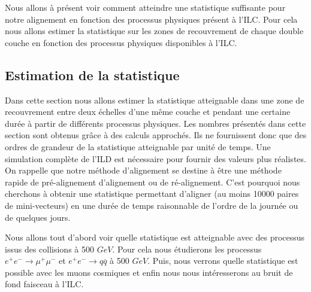   \medskip
  
  Nous allons \`a pr\'esent voir comment atteindre une statistique suffisante pour notre alignement en fonction des processus physiques pr\'esent \`a l'ILC. Pour cela nous allons estimer la statistique sur les zones de recouvrement de chaque double couche en fonction des processus physiques disponibles \`a l'ILC.
  
  \subsection{Estimation de la statistique}
  
  Dans cette section nous allons estimer la statistique atteignable dans une zone de recouvrement entre deux \'echelles d'une m\^eme couche et pendant une certaine dur\'ee \`a partir de diff\'erents processus physiques. Les nombres pr\'esent\'es dans cette section sont obtenus grâce \`a des calculs approch\'es. Ils ne fournissent donc que des ordres de grandeur de la statistique atteignable par unit\'e de temps. Une simulation compl\`ete de l'ILD est n\'ecessaire pour fournir des valeurs plus r\'ealistes. On rappelle que notre m\'ethode d'alignement se destine \`a \^etre une m\'ethode rapide de pr\'e-alignement d'alignement ou de r\'e-alignement. C'est pourquoi nous cherchons \`a obtenir une statistique permettant d'aligner (au moins 10000 paires de mini-vecteurs) en une dur\'ee de temps raisonnable de l'ordre de la journ\'ee ou de quelques jours.
  
  \medskip
  
  Nous allons tout d'abord voir quelle statistique est atteignable avec des processus issus des collisions \`a 500 $GeV$. Pour cela nous \'etudierons les processus $e^+ e^- \rightarrow \mu^+ \mu^-$ et $e^+ e^- \rightarrow q\overline{q}$ \`a 500 $GeV$. Puis, nous verrons quelle statistique est possible avec les muons cosmiques et enfin nous nous int\'eresserons au bruit de fond faisceau \`a l'ILC.
  
